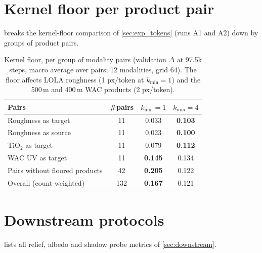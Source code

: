 \section{Kernel floor per product pair}
\label{sec:supp_floor}

 breaks the kernel-floor comparison of \cref{sec:exp_tokens} (runs A1 and A2) down by groups of product pairs.

\begin{table}[t]
  \centering
  \footnotesize
  \setlength{\tabcolsep}{3.5pt}
  \caption{Kernel floor, per group of modality pairs (validation $\Delta$ at 97.5k steps, macro average over pairs; 12 modalities, grid 64). The floor affects LOLA roughness (1 px/token at $k_{\min}{=}1$) and the 500\,m and 400\,m WAC products (2 px/token).}
  \label{tab:floor}
  \begin{tabular}{@{}lccc@{}}
    \toprule
    Pairs & \#pairs & $k_{\min}{=}1$ & $k_{\min}{=}4$ \\
    \midrule
    Roughness as target                & 11 & 0.033 & \textbf{0.103} \\
    Roughness as source                & 11 & 0.023 & \textbf{0.100} \\
    TiO$_2$ as target                  & 11 & 0.079 & \textbf{0.112} \\
    WAC UV as target                   & 11 & \textbf{0.145} & 0.134 \\
    Pairs without floored products     & 42 & \textbf{0.205} & 0.122 \\
    \midrule
    Overall (count-weighted)           & 132 & \textbf{0.167} & 0.121 \\
    \bottomrule
  \end{tabular}
\end{table}

\section{Downstream protocols}
\label{sec:supp_downstream}

 lists all relief, albedo and shadow probe metrics of \cref{sec:downstream}.

